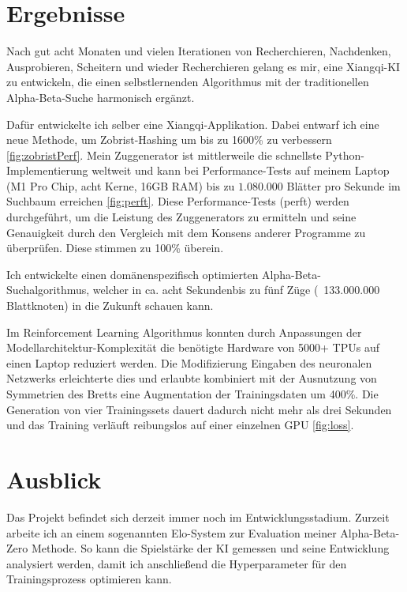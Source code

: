 \documentclass{jpp}
\begin{document}
\section{Ergebnisse}
Nach gut acht Monaten und vielen Iterationen von Recherchieren, Nachdenken, Ausprobieren, Scheitern und wieder Recherchieren gelang es mir, eine Xiangqi-KI zu entwickeln, die einen selbstlernenden Algorithmus mit der traditionellen Alpha-Beta-Suche harmonisch ergänzt. 

Dafür entwickelte ich selber eine Xiangqi-Applikation. Dabei entwarf ich eine neue Methode, um Zobrist-Hashing um bis zu 1600\% zu verbessern \ref{fig:zobristPerf}. Mein Zuggenerator ist mittlerweile die schnellste Python-Implementierung weltweit und kann bei Performance-Tests auf meinem Laptop (M1 Pro Chip, acht Kerne, 16GB RAM) bis zu $1.080.000$ Blätter pro Sekunde im Suchbaum erreichen \ref{fig:perft}. Diese Performance-Tests (perft) werden durchgeführt, um die Leistung des Zuggenerators zu ermitteln und seine Genauigkeit durch den Vergleich mit dem Konsens anderer Programme zu überprüfen. Diese stimmen zu 100\% überein. 

Ich entwickelte einen domänenspezifisch optimierten Alpha-Beta-Suchalgorithmus, welcher in ca. acht Sekundenbis zu fünf Züge (~133.000.000 Blattknoten) in die Zukunft schauen kann.

Im Reinforcement Learning Algorithmus konnten durch Anpassungen der Modellarchitektur-Komplexität die benötigte Hardware von 5000+ TPUs auf einen Laptop reduziert werden. Die Modifizierung Eingaben des neuronalen Netzwerks erleichterte dies und erlaubte kombiniert mit der Ausnutzung von Symmetrien des Bretts eine Augmentation der Trainingsdaten um 400\%. Die Generation von vier Trainingssets dauert dadurch nicht mehr als drei Sekunden und das Training verläuft reibungslos auf einer einzelnen GPU \ref{fig:loss}.

\section{Ausblick}
Das Projekt befindet sich derzeit immer noch im Entwicklungsstadium. Zurzeit arbeite ich an einem sogenannten Elo-System zur Evaluation meiner Alpha-Beta-Zero Methode. So kann die Spielstärke der KI gemessen und seine Entwicklung analysiert werden, damit ich anschließend die Hyperparameter für den Trainingsprozess optimieren kann.
\end{document}
